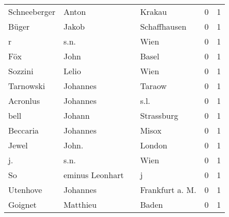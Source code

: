 \documentclass[10pt,a4paper,landscape]{article}
\begin{document}
\begin{longtable}{llllrr}
             Schneeberger &                              Anton &             &                                      Krakau &          0 &         1 \\
                    Büger &                              Jakob &             &                                Schaffhausen &          0 &         1 \\
                        r &                               s.n. &             &                                        Wien &          0 &         1 \\
                      Föx &                               John &             &                                       Basel &          0 &         1 \\
                  Sozzini &                              Lelio &             &                                        Wien &          0 &         1 \\
                Tarnowski &                           Johannes &             &                                      Taraow &          0 &         1 \\
                 Acronlus &                           Johannes &             &                                        s.l. &          0 &         1 \\
                     bell &                             Johann &             &                                  Strassburg &          0 &         1 \\
                 Beccaria &                           Johannes &             &                                       Misox &          0 &         1 \\
                    Jewel &                              John. &             &                                      London &          0 &         1 \\
                       j. &                               s.n. &             &                                        Wien &          0 &         1 \\
                       So &                    eminus Leonhart &             &                                           j &          0 &         1 \\
                 Utenhove &                           Johannes &             &                            Frankfurt a. M.  &          0 &         1 \\
                  Goignet &                           Matthieu &             &                                       Baden &          0 &         1 \\

\end{longtable}
\end{document}
